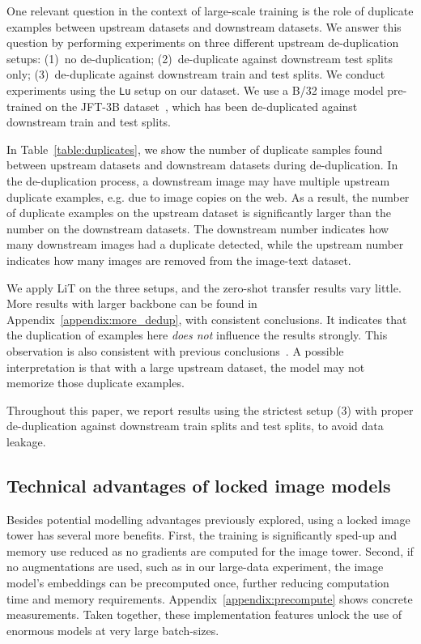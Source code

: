 \documentclass[10pt,twocolumn,letterpaper]{article}
\makeatletter
\def \lit {LiT\xspace}
\def \Lu {{\tt Lu}\xspace}
\renewcommand*{\eg}{e.g.\@\xspace}
\makeatother
\begin{document}
One relevant question in the context of large-scale training is the role of duplicate examples between upstream datasets and downstream datasets. 
We answer this question by performing experiments on three different upstream de-duplication setups: (1)~no de-duplication; (2)~de-duplicate against downstream test splits only; (3)~de-duplicate against downstream train and test splits.
We conduct experiments using the \Lu setup on our dataset.
We use a B/32 image model pre-trained on the JFT-3B dataset~\cite{vitg}, which has been de-duplicated against downstream train and test splits.

In Table~\ref{table:duplicates}, we show the number of duplicate samples found between upstream datasets and downstream datasets during de-duplication. 
In the de-duplication process, a downstream image may have multiple upstream duplicate examples, \eg due to image copies on the web. 
As a result, the number of duplicate examples on the upstream dataset is significantly larger than the number on the downstream datasets.
The downstream number indicates how many downstream images had a duplicate detected, while the upstream number indicates how many images are removed from the image-text dataset.

We apply \lit{} on the three setups, and the zero-shot transfer results vary little.
More results with larger backbone can be found in Appendix~\ref{appendix:more_dedup}, with consistent conclusions.
It indicates that the duplication of examples here \textit{does not} influence the results strongly.
This observation is also consistent with previous conclusions~\cite{bit,clip}.
A possible interpretation is that with a large upstream dataset, the model may not memorize those duplicate examples. 

Throughout this paper, we report results using the strictest setup (3) with proper de-duplication against downstream train splits and test splits, to avoid data leakage.



\subsection{Technical advantages of locked image models}
\label{sec:precompute}

Besides potential modelling advantages previously explored, using a locked image tower has several more benefits.
First, the training is significantly sped-up and memory use reduced as no gradients are computed for the image tower.
Second, if no augmentations are used, such as in our large-data experiment, the image model's embeddings can be precomputed once, further reducing computation time and memory requirements.
Appendix~\ref{appendix:precompute} shows concrete measurements.
Taken together, these implementation features unlock the use of enormous models at very large batch-sizes.
\end{document}

